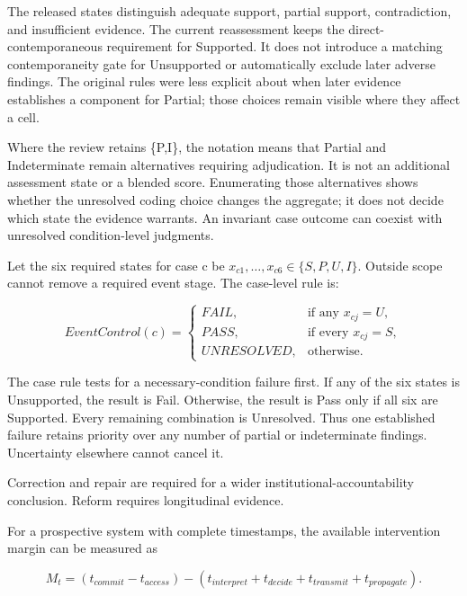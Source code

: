 \documentclass[11pt]{article}
\begin{document}
The released states distinguish adequate support, partial support, contradiction, and insufficient evidence. The current reassessment keeps the direct-contemporaneous requirement for Supported. It does not introduce a matching contemporaneity gate for Unsupported or automatically exclude later adverse findings. The original rules were less explicit about when later evidence establishes a component for Partial; those choices remain visible where they affect a cell.

Where the review retains \{P,I\}, the notation means that Partial and Indeterminate remain alternatives requiring adjudication. It is not an additional assessment state or a blended score. Enumerating those alternatives shows whether the unresolved coding choice changes the aggregate; it does not decide which state the evidence warrants. An invariant case outcome can coexist with unresolved condition-level judgments.

Let the six required states for case c be \(x_{c1},\ldots,x_{c6}\in\{S,P,U,I\}\). Outside scope cannot remove a required event stage. The case-level rule is:

\[
EventControl(c)=\begin{cases}FAIL,&\text{if any }x_{cj}=U,\\PASS,&\text{if every }x_{cj}=S,\\UNRESOLVED,&\text{otherwise.}\end{cases}
\]

The case rule tests for a necessary-condition failure first. If any of the six states is Unsupported, the result is Fail. Otherwise, the result is Pass only if all six are Supported. Every remaining combination is Unresolved. Thus one established failure retains priority over any number of partial or indeterminate findings. Uncertainty elsewhere cannot cancel it.

Correction and repair are required for a wider institutional-accountability conclusion. Reform requires longitudinal evidence.

For a prospective system with complete timestamps, the available intervention margin can be measured as

\[
M_t=(t_{commit}-t_{access})-(t_{interpret}+t_{decide}+t_{transmit}+t_{propagate}).
\]
\end{document}
